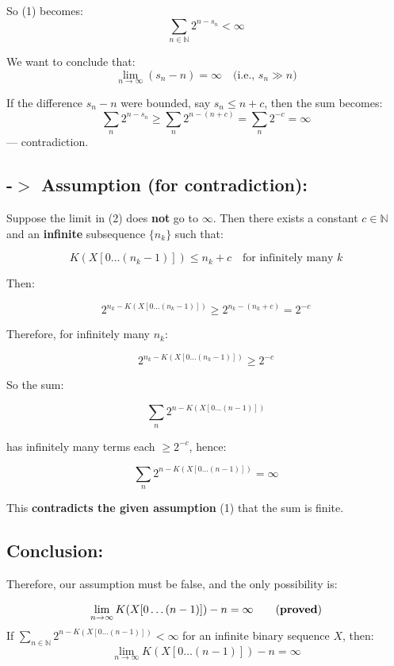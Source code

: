 \documentclass[12pt]{article}
\begin{document}
So (1) becomes:
\[
\sum_{n \in \mathbb{N}} 2^{n - s_n} < \infty
\]

We want to conclude that:
\[
\lim_{n \to \infty} (s_n - n) = \infty
\quad \text{(i.e., } s_n \gg n \text{)}
\]

If the difference \( s_n - n \) were bounded, say \( s_n \leq n + c \), then the sum becomes:
\[
\sum_n 2^{n - s_n} \geq \sum_n 2^{n - (n + c)} = \sum_n 2^{-c} = \infty
\]
— contradiction.


\subsection*{-$>$ Assumption (for contradiction):}

Suppose the limit in (2) does \textbf{not} go to \( \infty \). Then there exists a constant \( c \in \mathbb{N} \) and an \textbf{infinite} subsequence \( \{n_k\} \) such that:

\[
K(X[0\ldots(n_k - 1)]) \leq n_k + c
\quad \text{for infinitely many } k
\]

Then:

\[
2^{n_k - K(X[0\ldots(n_k - 1)])} \geq 2^{n_k - (n_k + c)} = 2^{-c}
\]

Therefore, for infinitely many \( n_k \):

\[
2^{n_k - K(X[0\ldots(n_k - 1)])} \geq 2^{-c}
\]

So the sum:

\[
\sum_n 2^{n - K(X[0\ldots(n-1)])}
\]

has infinitely many terms each \( \geq 2^{-c} \), hence:

\[
\sum_n 2^{n - K(X[0\ldots(n-1)])} = \infty
\]

This \textbf{contradicts the given assumption} (1) that the sum is finite.



\subsection*{Conclusion:}

Therefore, our assumption must be false, and the only possibility is:

\[
\lim_{n \to \infty} K(X[0\ldots(n-1)]) - n = \infty \tag{\textbf{proved}}
\]
\newline
\newline
If \(\sum_{n \in \mathbb{N}} 2^{n - K(X[0\ldots(n-1)])} < \infty\) for an infinite binary sequence \(X\), then:  
\[
\boxed{\lim_{n \to \infty} K(X[0\ldots(n-1)]) - n = \infty}
\]
\end{document}
